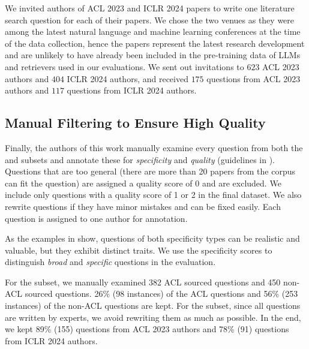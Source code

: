 We invited authors of ACL 2023 and ICLR 2024 papers to write one literature search question for each of their papers. We chose the two venues as they were among the latest natural language  and machine learning conferences at the time of the data collection, hence the papers represent the latest research development and are unlikely to have already been included in the pre-training data of LLMs and retrievers used in our evaluations.
We sent out invitations to $623$ ACL 2023 authors and $404$ ICLR 2024 authors, and received $175$ questions from ACL 2023 authors and $117$ questions from ICLR 2024 authors.

\subsection{Manual Filtering to Ensure High Quality}
\label{sec:filter}

Finally, the authors of this work manually examine every question from both the \inlineq{} and \authorq{} subsets and annotate these for \textit{specificity} and \textit{quality} (guidelines in ). 
Questions that are too general (there are more than 20 papers from the corpus can fit the question) are assigned a quality score of 0 and are excluded. We include only questions with a quality score of 1 or 2 in the final dataset. 
We also rewrite questions if they have minor mistakes and can be fixed easily.
Each question is assigned to one author for annotation.

As the examples in  show, 
questions of both specificity types can be realistic and valuable, but they exhibit distinct traits.
We use the specificity scores to distinguish \emph{broad} and \emph{specific} questions  in the evaluation.

For the \inlineq{} subset, 
we manually examined 382 ACL sourced questions and 450 non-ACL sourced questions.
26\% (98 instances) of the ACL questions and 
56\% (253 instances) of the non-ACL questions are kept. For the \authorq{} subset, since all questions are written by experts, we avoid rewriting them as much as possible. In the end, we kept 89\% (155) questions from ACL 2023 authors and 78\% (91) questions from ICLR 2024 authors.

\vspace{0.8em}
